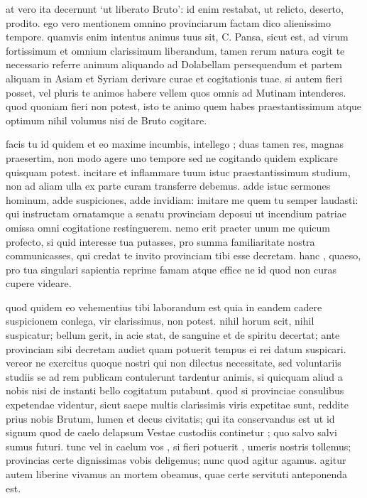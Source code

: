  at vero ita decernunt `ut liberato Bruto': id enim restabat, ut relicto, deserto, prodito. ego vero mentionem omnino provinciarum factam dico alienissimo tempore. quamvis enim intentus animus tuus sit, C. Pansa, sicut est, ad virum fortissimum et omnium clarissimum liberandum, tamen rerum natura cogit te necessario referre animum aliquando ad Dolabellam persequendum et partem aliquam in Asiam et Syriam derivare curae et cogitationis tuae. si autem fieri posset, vel pluris te animos habere vellem quos omnis ad Mutinam intenderes. quod quoniam fieri non potest, isto te animo quem habes praestantissimum atque optimum nihil volumus nisi de Bruto cogitare.

 facis tu id quidem et eo maxime incumbis, intellego ; duas tamen res, magnas praesertim, non modo agere uno tempore sed ne cogitando quidem explicare quisquam potest. incitare et inflammare tuum istuc praestantissimum studium, non ad aliam ulla ex parte curam transferre debemus. adde istuc sermones hominum, adde suspiciones, adde invidiam: imitare me quem tu semper laudasti: qui instructam ornatamque a senatu provinciam deposui ut incendium patriae omissa omni cogitatione restinguerem. nemo erit praeter unum me quicum profecto, si quid interesse tua putasses, pro summa familiaritate nostra communicasses, qui credat te invito provinciam tibi esse decretam. hanc , quaeso, pro tua singulari sapientia reprime famam atque effice ne id quod non curas cupere videare.

 quod quidem eo vehementius tibi laborandum est quia in eandem cadere suspicionem conlega, vir clarissimus, non potest. nihil horum scit, nihil suspicatur; bellum gerit, in acie stat, de sanguine et de spiritu decertat; ante provinciam sibi decretam audiet quam potuerit tempus ei rei datum suspicari. vereor ne exercitus quoque nostri qui non dilectus necessitate, sed voluntariis studiis se ad rem publicam contulerunt tardentur animis, si quicquam aliud a nobis nisi de instanti bello cogitatum putabunt. quod si provinciae consulibus expetendae videntur, sicut saepe multis clarissimis viris expetitae sunt, reddite prius nobis Brutum, lumen et decus civitatis; qui ita conservandus est ut id signum quod de caelo delapsum Vestae custodiis continetur ; quo salvo salvi sumus futuri. tunc vel in caelum vos , si fieri potuerit , umeris nostris tollemus; provincias certe dignissimas vobis deligemus; nunc quod agitur agamus. agitur autem liberine vivamus an mortem obeamus, quae certe servituti anteponenda est.

